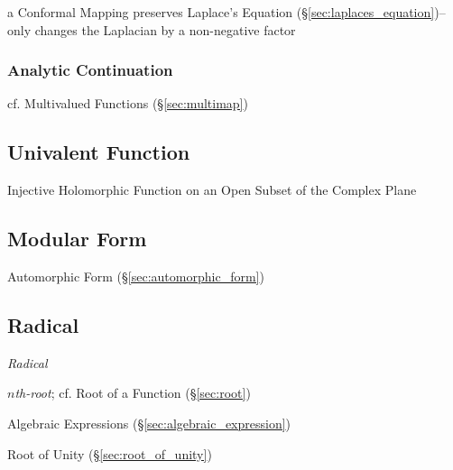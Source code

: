 a Conformal Mapping preserves Laplace's Equation
(\S\ref{sec:laplaces_equation})-- only changes the Laplacian by a non-negative
factor



\subsubsection{Analytic Continuation}\label{sec:analytic_continuation}

cf. Multivalued Functions (\S\ref{sec:multimap})



\subsection{Univalent Function}\label{sec:univalent_function}

Injective Holomorphic Function on an Open Subset of the Complex Plane



\subsection{Modular Form}\label{sec:modular_form}

Automorphic Form (\S\ref{sec:automorphic_form})



\subsection{Radical}\label{sec:radical}

\emph{Radical}

\emph{$n$th-root}; cf. Root of a Function (\S\ref{sec:root})

Algebraic Expressions (\S\ref{sec:algebraic_expression})

Root of Unity (\S\ref{sec:root_of_unity})



